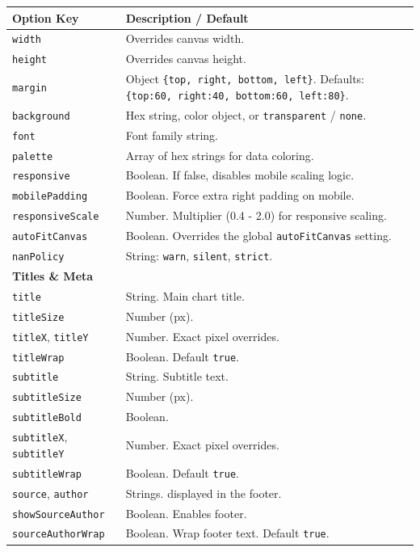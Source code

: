 \documentclass[10pt, a4paper]{article}
\begin{document}
\begin{longtable}{p{5cm} p{10cm}}
\toprule
\textbf{Option Key} & \textbf{Description / Default} \\
\midrule
\texttt{width} & Overrides canvas width. \\
\texttt{height} & Overrides canvas height. \\
\texttt{margin} & Object \texttt{\{top, right, bottom, left\}}. Defaults: \texttt{\{top:60, right:40, bottom:60, left:80\}}. \\
\texttt{background} & Hex string, color object, or \texttt{transparent} / \texttt{none}. \\
\texttt{font} & Font family string. \\
\texttt{palette} & Array of hex strings for data coloring. \\
\texttt{responsive} & Boolean. If false, disables mobile scaling logic. \\
\texttt{mobilePadding} & Boolean. Force extra right padding on mobile. \\
\texttt{responsiveScale} & Number. Multiplier (0.4 - 2.0) for responsive scaling. \\
\texttt{autoFitCanvas} & Boolean. Overrides the global \texttt{autoFitCanvas} setting. \\
\texttt{nanPolicy} & String: \texttt{warn}, \texttt{silent}, \texttt{strict}. \\
\midrule
\textbf{Titles \& Meta} & \\
\texttt{title} & String. Main chart title. \\
\texttt{titleSize} & Number (px). \\
\texttt{titleX}, \texttt{titleY} & Number. Exact pixel overrides. \\
\texttt{titleWrap} & Boolean. Default \texttt{true}. \\
\texttt{subtitle} & String. Subtitle text. \\
\texttt{subtitleSize} & Number (px). \\
\texttt{subtitleBold} & Boolean. \\
\texttt{subtitleX}, \texttt{subtitleY} & Number. Exact pixel overrides. \\
\texttt{subtitleWrap} & Boolean. Default \texttt{true}. \\
\texttt{source}, \texttt{author} & Strings. displayed in the footer. \\
\texttt{showSourceAuthor} & Boolean. Enables footer. \\
\texttt{sourceAuthorWrap} & Boolean. Wrap footer text. Default \texttt{true}. \\

\end{longtable}
\end{document}
